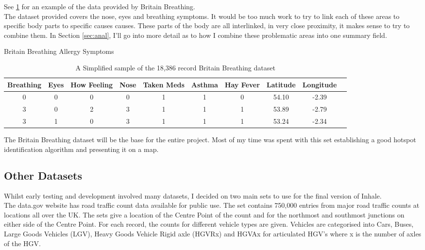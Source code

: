See \ref{bbdatatable} for an example of the data provided by Britain Breathing.\\

The dataset provided covers the nose, eyes and breathing symptoms. It would be too much work to try to link each of these areas to specific body parts to specific causes causes. These parts of the body are all interlinked, in very close proximity, it makes sense to try to combine them. In Section \ref{sec:anal}, I'll go into more detail as to how I combine these problematic areas into one summary field.\\


\begin{table}
\begin{center}
Britain Breathing Allergy Symptoms\\
\begin{tabular}{|c|c|c|c|c|c|c|c|c|c}\hline\hline
Breathing&Eyes&How Feeling&Nose&Taken Meds&Asthma&Hay Fever&Latitude&Longitude\\\hline
0&0&0&0&1&1&0&54.10&-2.39\\
3&0&2&3&1&1&1&53.89&-2.79\\
3&1&0&3&1&1&1&53.24&-2.34\\\hline\hline
\end{tabular}
\end{center}
\caption{A Simplified sample of the 18,386 record Britain Breathing dataset}\label{bbdatatable}
\end{table}

The Britain Breathing dataset will be the base for the entire project. Most of my time was spent with this set establishing a good hotspot identification algorithm and presenting it on a map.

\subsection{Other Datasets}

Whilst early testing and development involved many datasets, I decided on two main sets to use for the final version of Inhale.\\

The data.gov website has road traffic count data available for public use. The set contains  750,000 entries from major road traffic counts at locations all over the UK. The sets give a location of the Centre Point of the count and for the northmost and southmost junctions on either side of the Centre Point. For each record, the counts for different vehicle types are given. Vehicles are categorised into Cars, Buses, Large Goods Vehicles (LGV), Heavy Goods Vehicle Rigid axle (HGVRx) and HGVAx for articulated HGV's where x is the number of axles of the HGV.\\

